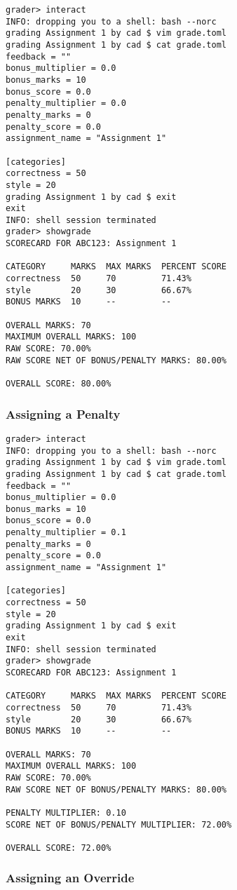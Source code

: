 \documentclass{book}
\begin{document}
\begin{verbatim}
grader> interact
INFO: dropping you to a shell: bash --norc
grading Assignment 1 by cad $ vim grade.toml
grading Assignment 1 by cad $ cat grade.toml
feedback = ""
bonus_multiplier = 0.0
bonus_marks = 10
bonus_score = 0.0
penalty_multiplier = 0.0
penalty_marks = 0
penalty_score = 0.0
assignment_name = "Assignment 1"

[categories]
correctness = 50
style = 20
grading Assignment 1 by cad $ exit
exit
INFO: shell session terminated
grader> showgrade
SCORECARD FOR ABC123: Assignment 1

CATEGORY     MARKS  MAX MARKS  PERCENT SCORE
correctness  50     70         71.43%
style        20     30         66.67%
BONUS MARKS  10     --         --

OVERALL MARKS: 70
MAXIMUM OVERALL MARKS: 100
RAW SCORE: 70.00%
RAW SCORE NET OF BONUS/PENALTY MARKS: 80.00%

OVERALL SCORE: 80.00%
\end{verbatim}

\subsubsection{Assigning a Penalty}

\begin{verbatim}
grader> interact
INFO: dropping you to a shell: bash --norc
grading Assignment 1 by cad $ vim grade.toml
grading Assignment 1 by cad $ cat grade.toml
feedback = ""
bonus_multiplier = 0.0
bonus_marks = 10
bonus_score = 0.0
penalty_multiplier = 0.1
penalty_marks = 0
penalty_score = 0.0
assignment_name = "Assignment 1"

[categories]
correctness = 50
style = 20
grading Assignment 1 by cad $ exit
exit
INFO: shell session terminated
grader> showgrade
SCORECARD FOR ABC123: Assignment 1

CATEGORY     MARKS  MAX MARKS  PERCENT SCORE
correctness  50     70         71.43%
style        20     30         66.67%
BONUS MARKS  10     --         --

OVERALL MARKS: 70
MAXIMUM OVERALL MARKS: 100
RAW SCORE: 70.00%
RAW SCORE NET OF BONUS/PENALTY MARKS: 80.00%

PENALTY MULTIPLIER: 0.10
SCORE NET OF BONUS/PENALTY MULTIPLIER: 72.00%

OVERALL SCORE: 72.00%
\end{verbatim}

\subsubsection{Assigning an Override}
\end{document}
